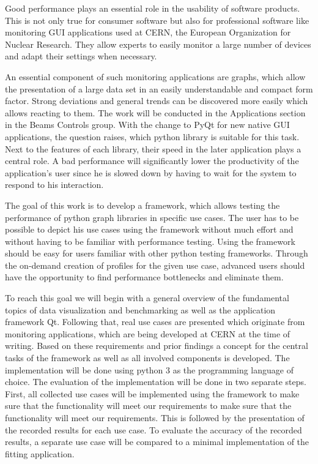 

\Abstract
Good performance plays an essential role in the usability of software products.
This is not only true for consumer software but also for professional software
like monitoring GUI applications used at CERN, the European Organization for
Nuclear Research. They allow experts to easily monitor a large number of devices
and adapt their settings when necessary.

An essential component of such monitoring applications are graphs, which allow
the presentation of a large data set in an easily understandable and compact
form factor. Strong deviations and general trends can be discovered more easily
which allows reacting to them. The work will be conducted in the Applications
section in the Beams Controls group. With the change to PyQt for new native GUI
applications, the question raises, which python library is suitable for this
task. Next to the features of each library, their speed in the later application
plays a central role. A bad performance will significantly lower the
productivity of the application's user since he is slowed down by having to wait
for the system to respond to his interaction.

The goal of this work is to develop a framework, which allows testing the
performance of python graph libraries in specific use cases. The user has to be
possible to depict his use cases using the framework without much effort and
without having to be familiar with performance testing. Using the framework
should be easy for users familiar with other python testing frameworks. Through
the on-demand creation of profiles for the given use case, advanced users should
have the opportunity to find performance bottlenecks and eliminate them.

To reach this goal we will begin with a general overview of the fundamental
topics of data visualization and benchmarking as well as the application
framework Qt. Following that, real use cases are presented which originate from
monitoring applications, which are being developed at CERN at the time of
writing. Based on these requirements and prior findings a concept for the
central tasks of the framework as well as all involved components is developed.
The implementation will be done using python 3 as the programming language of
choice. The evaluation of the implementation will be done in two separate steps.
First, all collected use cases will be implemented using the framework to make
sure that the functionality will meet our requirements to make sure that the
functionality will meet our requirements. This is followed by the presentation
of the recorded results for each use case. To evaluate the accuracy of the
recorded results, a separate use case will be compared to a minimal
implementation of the fitting application.
